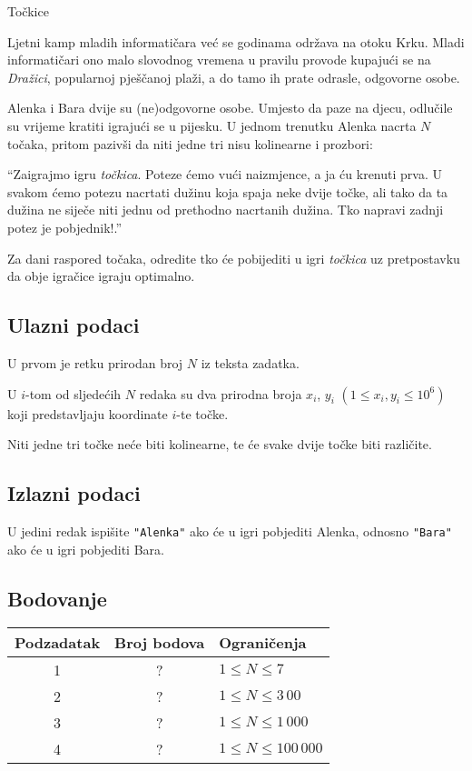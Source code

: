\begin{statement}[
  problempoints=100,
  timelimit=1 second,
  memorylimit=1024 MiB,
]{Točkice}

Ljetni kamp mladih informatičara već se godinama održava na otoku Krku.  Mladi
informatičari ono malo slovodnog vremena u pravilu provode kupajući se na
\textit{Dražici}, popularnoj pješčanoj plaži, a do tamo ih prate odrasle,
odgovorne osobe.

Alenka i Bara dvije su (ne)odgovorne osobe. Umjesto da paze na djecu, odlučile
su vrijeme kratiti igrajući se u pijesku. U jednom trenutku Alenka nacrta $N$
točaka, pritom pazivši da niti jedne tri nisu kolinearne i prozbori:

``Zaigrajmo igru \textit{točkica}. Poteze ćemo vući naizmjence, a ja ću krenuti
  prva. U svakom ćemo potezu nacrtati dužinu koja spaja neke dvije točke, ali
  tako da ta dužina ne siječe niti jednu od prethodno nacrtanih dužina. Tko
  napravi zadnji potez je pobjednik!.''

Za dani raspored točaka, odredite tko će pobijediti u igri \textit{točkica} uz
pretpostavku da obje igračice igraju optimalno.

\subsection*{Ulazni podaci}
U prvom je retku prirodan broj $N$ iz teksta zadatka.

U $i$-tom od sljedećih $N$ redaka su dva prirodna broja $x_i$, $y_i$ $(1 \leq
x_i, y_i \leq 10^6)$ koji predstavljaju koordinate $i$-te točke.

Niti jedne tri točke neće biti kolinearne, te će svake dvije točke biti različite.
\subsection*{Izlazni podaci}
U jedini redak ispišite \texttt{"Alenka"} ako će u igri pobjediti Alenka,
odnosno \texttt{"Bara"} ako će u igri pobjediti Bara.

\subsection*{Bodovanje}
{\renewcommand{\arraystretch}{1.4}
  \setlength{\tabcolsep}{6pt}
  \begin{tabular}{ccl}
 Podzadatak & Broj bodova & Ograničenja \\ \midrule
  1 & ? & $1 \le N \le 7$\\
  2 & ? & $1 \le N \le 3\,00$\\
  3 & ? & $1 \le N \le 1\,000$\\
  4 & ? & $1 \le N \le 100\,000$\\
\end{tabular}}


\end{statement}
